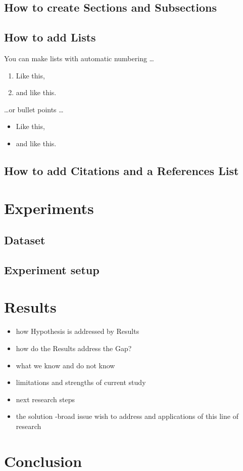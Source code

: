 \documentclass[a4paper]{article}
\begin{document}
\subsection{How to create Sections and Subsections}
\subsection{How to add Lists}
You can make lists with automatic numbering \dots
\begin{enumerate}
\item Like this,
\item and like this.
\end{enumerate}
\dots or bullet points \dots
\begin{itemize}
\item Like this,
\item and like this.
\end{itemize}

\subsection{How to add Citations and a References List}

\section{Experiments}
\subsection{Dataset}
\subsection{Experiment setup}
\section{Results}
\begin{itemize}
\item  how Hypothesis is addressed by Results
\item  how do the Results address the Gap?
\item  what we know and do not know
\item  limitations and strengths of current study
\item  next research steps
\item  the solution -broad issue wish to address and applications of this line of research 
\end{itemize}
\section{Conclusion}



\end{document}
